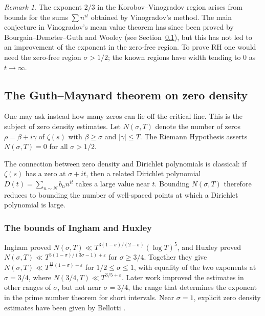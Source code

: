 \documentclass[11pt]{amsart}
\theoremstyle{definition}
\theoremstyle{remark}
\newtheorem{remark}[theorem]{Remark}
\begin{document}
\begin{remark}
The exponent $2/3$ in the Korobov--Vinogradov region arises from bounds for the sums $\sum n^{it}$ obtained by Vinogradov's method. The main conjecture in Vinogradov's mean value theorem has since been proved by Bourgain--Demeter--Guth \cite{bourgain2016} and Wooley \cite{wooley2016} (see Section~\ref{sec:gm}), but this has not led to an improvement of the exponent in the zero-free region. To prove RH one would need the zero-free region $\sigma > 1/2$; the known regions have width tending to $0$ as $t \to \infty$.
\end{remark}

\subsection{The Guth--Maynard theorem on zero density}\label{sec:gm}

One may ask instead how many zeros can lie off the critical line. This is the subject of zero density estimates. Let $N(\sigma, T)$ denote the number of zeros $\rho = \beta + i\gamma$ of $\zeta(s)$ with $\beta \ge \sigma$ and $|\gamma| \le T$. The Riemann Hypothesis asserts $N(\sigma, T) = 0$ for all $\sigma > 1/2$.

The connection between zero density and Dirichlet polynomials is classical: if $\zeta(s)$ has a zero at $\sigma + it$, then a related Dirichlet polynomial $D(t) = \sum_{n \sim N} b_n n^{it}$ takes a large value near $t$. Bounding $N(\sigma, T)$ therefore reduces to bounding the number of well-spaced points at which a Dirichlet polynomial is large.

\subsubsection{The bounds of Ingham and Huxley}

Ingham \cite{ingham1940} proved $N(\sigma,T)\ll T^{3(1-\sigma)/(2-\sigma)}(\log T)^5$, and Huxley \cite{huxley1972} proved $N(\sigma,T)\ll T^{3(1-\sigma)/(3\sigma-1)+\varepsilon}$ for $\sigma\ge 3/4$. Together they give $N(\sigma,T)\ll T^{\frac{12}{5}(1-\sigma)+\varepsilon}$ for $1/2\le\sigma\le1$, with equality of the two exponents at $\sigma=3/4$, where $N(3/4, T) \ll T^{3/5 + \varepsilon}$. Later work improved the estimates in other ranges of $\sigma$, but not near $\sigma = 3/4$, the range that determines the exponent in the prime number theorem for short intervals. Near $\sigma = 1$, explicit zero density estimates have been given by Bellotti \cite{bellotti2023}.
\end{document}
